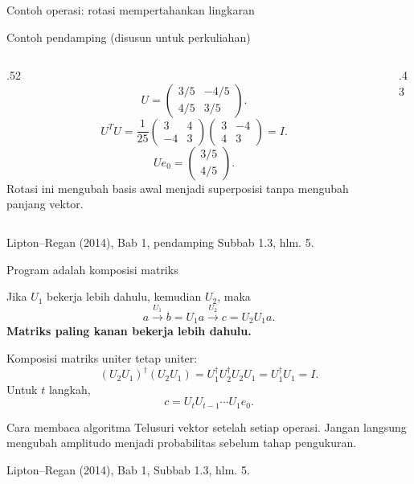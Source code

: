 \documentclass[aspectratio=169,11pt]{beamer}
\newcommand{\bookref}[1]{\par\vfill{\scriptsize\color{gray}Lipton--Regan (2014), Bab 1, #1.}}
\newcommand{\extra}{\par\textcolor{AcademicBlue}{\small Contoh pendamping (disusun untuk perkuliahan)}\par}
\begin{document}
\begin{frame}{Contoh operasi: rotasi mempertahankan lingkaran}

\extra
\begin{columns}[c]
\begin{column}{.52\textwidth}
\[
 U=\begin{pmatrix}3/5&-4/5\\4/5&3/5\end{pmatrix}.
\]
\[
 U^TU=\frac1{25}\begin{pmatrix}3&4\\-4&3\end{pmatrix}
 \begin{pmatrix}3&-4\\4&3\end{pmatrix}=I.
\]
\[
 Ue_0=\begin{pmatrix}3/5\\4/5\end{pmatrix}.
\]
Rotasi ini mengubah basis awal menjadi superposisi tanpa mengubah panjang vektor.
\end{column}
\begin{column}{.43\textwidth}
\centering
{}
\end{column}
\end{columns}
\bookref{pendamping Subbab 1.3, hlm. 5}

\end{frame}

\begin{frame}{Program adalah komposisi matriks}
\small

Jika $U_1$ bekerja lebih dahulu, kemudian $U_2$, maka
\[
 a\xrightarrow{U_1}b=U_1a\xrightarrow{U_2}c=U_2U_1a.
\]
\textbf{Matriks paling kanan bekerja lebih dahulu.}
\par\medskip
Komposisi matriks uniter tetap uniter:
\[
 (U_2U_1)^\dagger(U_2U_1)
 =U_1^\dagger U_2^\dagger U_2U_1
 =U_1^\dagger U_1=I.
\]
Untuk $t$ langkah,
\[
 c=U_tU_{t-1}\cdots U_1e_0.
\]
\begin{block}{Cara membaca algoritma}
Telusuri vektor setelah setiap operasi. Jangan langsung mengubah amplitudo menjadi probabilitas sebelum tahap pengukuran.
\end{block}
\vspace{-4pt}
\bookref{Subbab 1.3, hlm. 5}

\end{frame}
\end{document}

